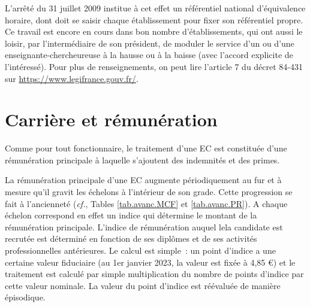 \label{referentiel}
L'arr\^et\'e du 31 juillet 2009 institue \`a cet effet un r\'ef\'erentiel
national d'\'equivalence horaire, dont doit se saisir chaque \'etablissement
pour fixer son r\'ef\'erentiel propre. Ce travail est encore en cours dans bon nombre
d'\'etablissements, qui ont aussi le loisir, par l'interm\'ediaire de son pr\'esident,
de moduler le service d'un ou d'une enseignant\mp e-chercheur\mp euse \`a la hausse ou \`a la baisse (avec l'accord
explicite de l'int\'eress\'e). Pour plus de renseignements, on peut lire l'article 7 du d\'ecret 84-431 sur
\url{https://www.legifrance.gouv.fr/}.


\section{Carri\`ere et r\'emun\'eration}
\label{salairesEC}

Comme pour tout fonctionnaire, le traitement d'un\mp e EC est constitu\'ee
d'une r\'emun\'eration principale \`a laquelle s'ajoutent des indemnit\'es et des primes.

La r\'emun\'eration principale d'un\mp e EC augmente
p\'e\-rio\-di\-quement au fur et \`a mesure qu'il gravit les
\'echelons \`a l'int\'erieur de son grade. Cette progression se fait \`a l'anciennet\'e ({\em cf.}, Tables \ref{tab.avanc.MCF} et \ref{tab.avanc.PR}).
A chaque \'echelon correspond en effet un indice qui d\'etermine le montant de la
r\'emun\'eration principale. L'indice de r\'emun\'eration auquel le\mp la candidat\mp e est recrut\'e\mp e est d\'etermin\'e en fonction de ses dipl\^omes et de ses activit\'es professionnelles ant\'erieures. Le calcul est simple~: un point
d'indice a une certaine valeur fiduciaire (au 1er janvier 2023, la valeur est fix\'ee \`a 4,85 \euro) et le traitement est
calcul\'e par simple multiplication du nombre de points d'indice par
cette valeur nominale. La valeur du point d'indice est
r\'e\'evalu\'ee de mani\`ere \'episodique.

